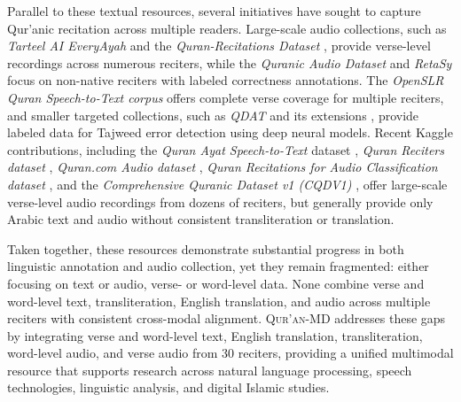 Parallel to these textual resources, several initiatives have sought to capture Qur’anic recitation across multiple readers. Large-scale audio collections, such as \emph{Tarteel AI EveryAyah}\cite{khan2021tarteel} and the \emph{Quran-Recitations Dataset} \cite{quran_recitations_hf_dataset}, provide verse-level recordings across numerous reciters, while the \emph{Quranic Audio Dataset} \cite{quran_audio_dataset2024} and \emph{RetaSy} \cite{salameh2024retasy} focus on non-native reciters with labeled correctness annotations. The \emph{OpenSLR Quran Speech-to-Text corpus} \cite{openslr132} offers complete verse coverage for multiple reciters, and smaller targeted collections, such as \emph{QDAT} \cite{osman2021qdat} and its extensions \cite{eval_pronunciation_tajweed2025}, provide labeled data for Tajweed error detection using deep neural models. Recent Kaggle contributions, including the \emph{Quran Ayat Speech-to-Text} dataset \cite{bigguyubuntu2023ayat}, \emph{Quran Reciters dataset} \cite{omartariq2025}, \emph{Quran.com Audio dataset} \cite{abdo3id2022qurancom}, \emph{Quran Recitations for Audio Classification dataset} \cite{alrajeh2021recitations}, and the \emph{Comprehensive Quranic Dataset v1 (CQDV1)} \cite{cqdv12024}, offer large-scale verse-level audio recordings from dozens of reciters, but generally provide only Arabic text and audio without consistent transliteration or translation.

Taken together, these resources demonstrate substantial progress in both linguistic annotation and audio collection, yet they remain fragmented: either focusing on text or audio, verse- or word-level data. None combine verse and word-level text, transliteration, English translation, and audio across multiple reciters with consistent cross-modal alignment. \textsc{Qur’an-MD} addresses these gaps by integrating verse and word-level text, English translation, transliteration, word-level audio, and verse audio from 30 reciters, providing a unified multimodal resource that supports research across natural language processing, speech technologies, linguistic analysis, and digital Islamic studies.
